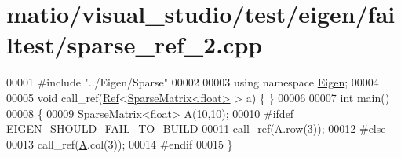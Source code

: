 \hypertarget{matio_2visual__studio_2test_2eigen_2failtest_2sparse__ref__2_8cpp_source}{}\section{matio/visual\+\_\+studio/test/eigen/failtest/sparse\+\_\+ref\+\_\+2.cpp}
\label{matio_2visual__studio_2test_2eigen_2failtest_2sparse__ref__2_8cpp_source}

\begin{DoxyCode}
00001 \textcolor{preprocessor}{#include "../Eigen/Sparse"}
00002 
00003 \textcolor{keyword}{using namespace }\hyperlink{namespace_eigen}{Eigen};
00004 
00005 \textcolor{keywordtype}{void} call\_ref(\hyperlink{group___core___module_class_eigen_1_1_ref}{Ref}<\hyperlink{group___sparse_core___module_class_eigen_1_1_sparse_matrix}{SparseMatrix<float>} > a) \{ \}
00006 
00007 \textcolor{keywordtype}{int} main()
00008 \{
00009   \hyperlink{group___sparse_core___module_class_eigen_1_1_sparse_matrix}{SparseMatrix<float>} \hyperlink{group___core___module_class_eigen_1_1_matrix}{A}(10,10);
00010 \textcolor{preprocessor}{#ifdef EIGEN\_SHOULD\_FAIL\_TO\_BUILD}
00011   call\_ref(\hyperlink{group___core___module_class_eigen_1_1_matrix}{A}.row(3));
00012 \textcolor{preprocessor}{#else}
00013   call\_ref(\hyperlink{group___core___module_class_eigen_1_1_matrix}{A}.col(3));
00014 \textcolor{preprocessor}{#endif}
00015 \}
\end{DoxyCode}
